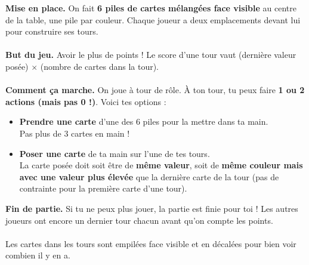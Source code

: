 \documentclass[a4paper]{memoir}
\begin{document}
{\footnotesize

\noindent
\textbf{ Mise en place.} On fait \textbf{6 piles de cartes mélangées face visible} au centre de la table, une pile par couleur.
Chaque joueur a deux emplacements devant lui pour construire ses tours.
\\
\\
\noindent
\textbf{ But du jeu.} Avoir le plus de points ! Le score d’une tour vaut (dernière valeur posée) $\times$
(nombre de cartes dans la tour).
\\
\\
\noindent
\textbf{ Comment ça marche.} On joue à tour de rôle. À ton tour, tu peux faire \textbf{1 ou 2 actions (mais pas 0 !)}. Voici tes options :
\begin{itemize}
\item\textbf{Prendre une carte} d'une des 6 piles pour la mettre dans ta main. 
\\
 Pas plus de 3 cartes en main !
\item\textbf{Poser une carte} de ta main sur l'une de tes tours. 
\\
 La carte posée doit soit être de \textbf{même valeur}, soit de \textbf{même couleur mais avec une valeur plus élevée} que la dernière carte de la tour (pas de contrainte pour la première carte d'une tour).
\end{itemize}
\noindent
\textbf{ Fin de partie.}
Si tu ne peux plus jouer, la partie est finie pour toi !
Les autres joueurs ont encore un dernier tour chacun avant qu’on compte les points.
\\
\\
\noindent
{} Les cartes dans les tours sont empilées face visible et en décalées pour bien voir combien il y en a.
}
\end{document}
